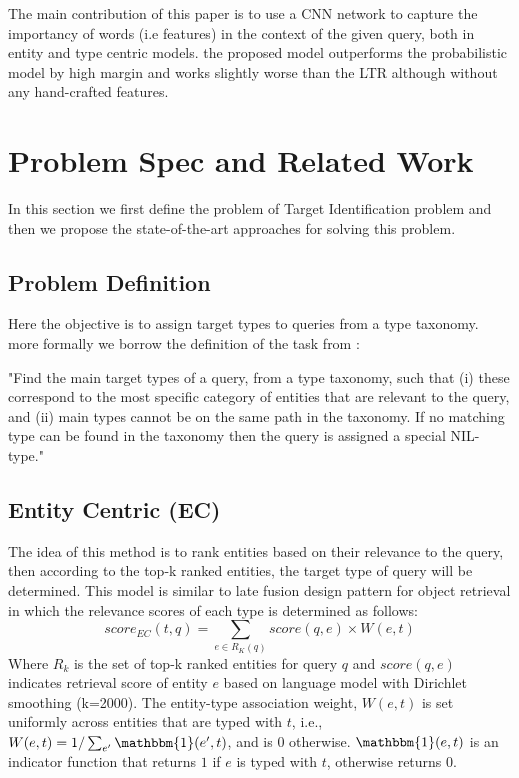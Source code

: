 The main contribution of this paper is to use a CNN network to capture the importancy of words (i.e features) in the context of the given query, both in entity and type centric models. the proposed model outperforms the probabilistic model by high margin and works slightly worse than the LTR although without any hand-crafted features.

\section{Problem Spec and Related Work}
In this section we first define the problem of Target Identification problem and then we propose the state-of-the-art approaches for solving this problem.

\subsection{Problem Definition}
Here the objective is to assign target types to queries from a type taxonomy. more formally we borrow the definition of the task from \cite{} :

"Find the main target types of a query, from a type taxonomy, such that (i) these correspond to the most specific category of entities that are relevant to the query, and (ii) main types cannot be on the same path in the taxonomy. If no matching type can be found in the taxonomy then the query is assigned a special NIL-type."

\subsection{Entity Centric (EC)}\label{EC}
The idea of this method is to rank entities based on their relevance to the query, then according to the top-k ranked entities, the target type of query will be determined. This model is similar to late fusion design pattern for object retrieval \cite{22Hasibi} in which the relevance scores of each type is determined as follows:
\begin{equation}
	score_{EC}(t,q) = \sum_{e\in R_K(q)}{score(q,e)\times W(e,t)}
\end{equation}
Where $R_k$ is the set of top-k ranked entities for query $q$ and $score(q,e)$ indicates retrieval score of entity $e$ based on language model with Dirichlet smoothing (k=2000). The entity-type association weight, $W(e,t)$ is set uniformly across entities that are typed with $t$, i.e., $W(e,t)=1/\sum_{e^\prime}{\mathbbm{1}(e^\prime,t)}$, and is 0 otherwise.
$\mathbbm{1}(e,t)$ is an indicator function that returns $1$ if $e$ is typed with $t$, otherwise returns $0$.

